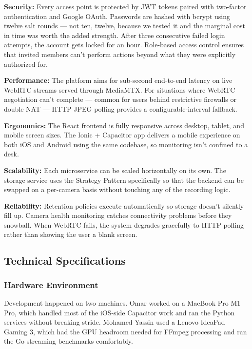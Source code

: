 \documentclass[12pt,a4paper,oneside]{report}
\begin{document}
\textbf{Security:} Every access point is protected by JWT tokens paired with two-factor authentication and Google OAuth. Passwords are hashed with bcrypt using twelve salt rounds — not ten, twelve, because we tested it and the marginal cost in time was worth the added strength. After three consecutive failed login attempts, the account gets locked for an hour. Role-based access control ensures that invited members can't perform actions beyond what they were explicitly authorized for.

\textbf{Performance:} The platform aims for sub-second end-to-end latency on live WebRTC streams served through MediaMTX. For situations where WebRTC negotiation can't complete — common for users behind restrictive firewalls or double NAT — HTTP JPEG polling provides a configurable-interval fallback.

\textbf{Ergonomics:} The React frontend is fully responsive across desktop, tablet, and mobile screen sizes. The Ionic + Capacitor app delivers a mobile experience on both iOS and Android using the same codebase, so monitoring isn't confined to a desk.

\textbf{Scalability:} Each microservice can be scaled horizontally on its own. The storage service uses the Strategy Pattern specifically so that the backend can be swapped on a per-camera basis without touching any of the recording logic.

\textbf{Reliability:} Retention policies execute automatically so storage doesn't silently fill up. Camera health monitoring catches connectivity problems before they snowball. When WebRTC fails, the system degrades gracefully to HTTP polling rather than showing the user a blank screen.

\subsection{Technical Specifications}
\label{subsec:technical_specs}

\subsubsection{Hardware Environment}
\hspace{0.8cm}Development happened on two machines. Omar worked on a MacBook Pro M1 Pro, which handled most of the iOS-side Capacitor work and ran the Python services without breaking stride. Mohamed Yassin used a Lenovo IdeaPad Gaming 3, which had the GPU headroom needed for FFmpeg processing and ran the Go streaming benchmarks comfortably.
\end{document}

